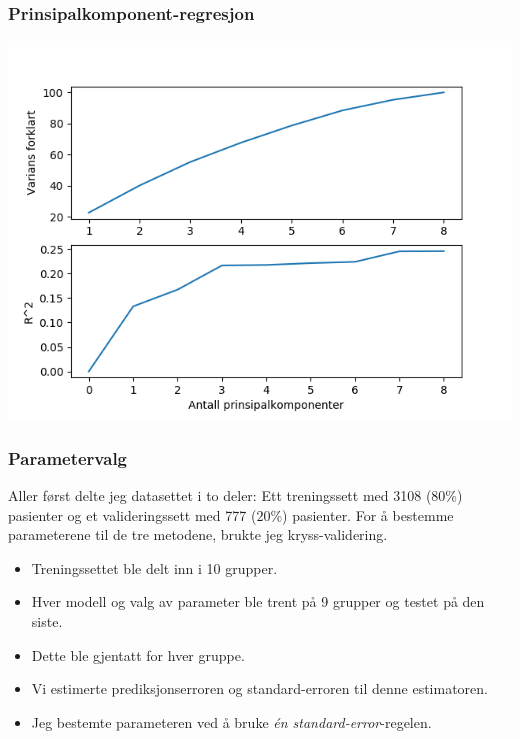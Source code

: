 \documentclass[aspectratio=169]{beamer}
\begin{document}
\begin{frame}
  \frametitle{Prinsipalkomponent-regresjon}
  \begin{center}
    \includegraphics[height=0.8\textheight]{pcr.png}
  \end{center}
\end{frame}

\begin{frame}
  \frametitle{Parametervalg}
  Aller først delte jeg datasettet i to deler: Ett treningssett med 3108 (\(80\%\)) pasienter og et valideringssett med 777 (\(20\%\)) pasienter.
  \pause
  For å bestemme parameterene til de tre metodene, brukte jeg kryss-validering.
  \pause
  \begin{itemize}
    \pause
    \item Treningssettet ble delt inn i 10 grupper.
    \pause
    \item Hver modell og valg av parameter ble trent på 9 grupper og testet på den siste.
    \pause
    \item Dette ble gjentatt for hver gruppe.
    \pause
    \item Vi estimerte prediksjonserroren og standard-erroren til denne estimatoren.
    \pause
    \item Jeg bestemte parameteren ved å bruke \emph{én standard-error}-regelen.
  \end{itemize}
\end{frame}
\end{document}
